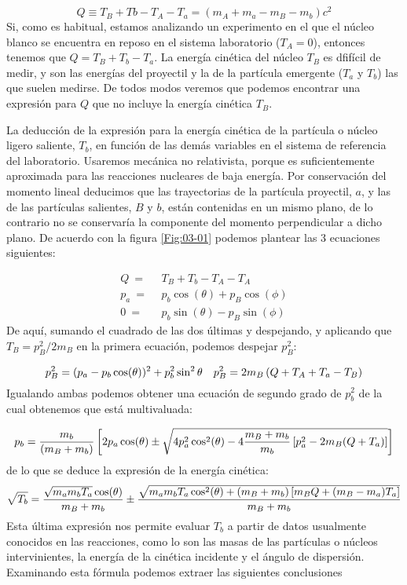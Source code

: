 \begin{equation}
    Q \equiv T_B + Tb - T_A - T_a = (m_A + m_a - m_B - m_b) c^2
\end{equation}
Si, como es habitual, estamos analizando un experimento en el que el núcleo blanco se encuentra en reposo en el sistema laboratorio ($T_A=0$), entonces tenemos que $Q = T_B + T_b - T_a$. La energía cinética del núcleo $T_B$ es dfifícil de medir, y son las energías del proyectil y la de la partícula emergente ($T_a$ y $T_b$) las que suelen medirse. De todos modos veremos que podemos encontrar una expresión para $Q$ que no incluye la energía cinética $T_B$. 

La deducción de la expresión para la energía cinética de la partícula o núcleo ligero saliente, $T_b$, en función de las demás variables en el sistema de referencia del laboratorio. Usaremos mecánica no relativista, porque es suficientemente aproximada para las reacciones nucleares de baja energía. Por conservación del momento lineal deducimos que las trayectorias de la partícula proyectil, $a$, y las de las partículas salientes, $B$ y $b$, están contenidas en un mismo plano, de lo contrario no se conservaría la componente del momento perpendicular a dicho plano. De acuerdo con la figura \ref{Fig:03-01} podemos plantear las 3 ecuaciones siguientes:

\begin{equation}
	\begin{split}
		Q \ = \ & \ T_B + T_b - T_A - T_A \\
		p_a \  = \ & \ p_b \cos (\theta) + p_B \cos (\phi) \\
		0 \ = \ & \ p_b \sin (\theta) - p_B \sin (\phi)
	\end{split}
\end{equation}
De aquí, sumando el cuadrado de las dos últimas y despejando, y aplicando que $T_B=p^2_B/2m_B$ en la primera ecuación, podemos despejar $p_B^2$:

\begin{equation}
	p_B^2 = (p_a - p_b \cos (\theta))^2 + p_b^2 \sin^2 \theta \quad p_B^2 = 2m_B \left( Q+T_A+T_a-T_B \right)
\end{equation} 
Igualando ambas podemos obtener una ecuación de segundo grado de $p_b^2$ de la cual obtenemos que está multivaluada:

\begin{equation}
	p_b = \frac{m_b}{(m_B + m_b)} \left[ 2p_a \cos (\theta) \pm \sqrt{4p_a^2 \cos^2 (\theta)- 4\frac{m_B+m_b}{m_b} \left[ p_a^2  -2m_B(Q+T_a) \right] } \right]
\end{equation}
de lo que se deduce la expresión de la energía cinética:
\begin{equation}
	\sqrt{T_b} = \frac{\sqrt{m_a m_b T_a}  \cos (\theta)}{m_B+m_b} \pm \frac{\sqrt{m_am_b T_a \cos^2 (\theta) + (m_B+m_b) \left[ m_BQ+(m_B-m_a)T_a \right]}}{m_B+m_b}   \label{Ec:03-02-07}       
\end{equation}
Esta última expresión nos permite evaluar $T_b$  a partir de datos usualmente conocidos en las reacciones, como lo son las masas de las partículas o núcleos intervinientes, la energía de la cinética incidente y el ángulo de dispersión. Examinando esta fórmula podemos extraer las siguientes conclusiones

